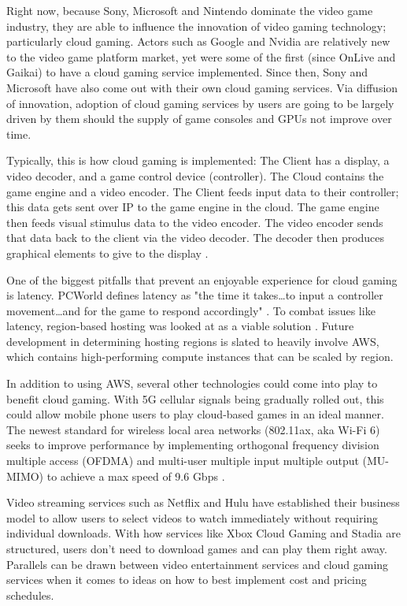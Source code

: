 \documentclass[titlepage, 12pt]{article}
\begin{document}
Right now, because Sony, Microsoft and Nintendo dominate the video game industry, they are able to influence the innovation of video gaming technology; particularly cloud gaming. Actors such as Google and Nvidia are relatively new to the video game platform market, yet were some of the first (since OnLive and Gaikai) to have a cloud gaming service implemented. Since then, Sony and Microsoft have also come out with their own cloud gaming services. Via diffusion of innovation, adoption of cloud gaming services by users are going to be largely driven by them should the supply of game consoles and GPUs not improve over time.

Typically, this is how cloud gaming is implemented: The Client has a display, a video decoder, and a game control device (controller). The Cloud contains the game engine and a video encoder. The Client feeds input data to their controller; this data gets sent over IP to the game engine in the cloud. The game engine then feeds visual stimulus data to the video encoder. The video encoder sends that data back to the client via the video decoder. The decoder then produces graphical elements to give to the display \citep{multimedia-systems}.

One of the biggest pitfalls that prevent an enjoyable experience for cloud gaming is latency. PCWorld defines latency as "the time it takes…to input a controller movement…and for the game to respond accordingly" \citep{pcworld}. To combat issues like latency, region-based hosting was looked at as a viable solution \citep{conf}. Future development in determining hosting regions is slated to heavily involve AWS, which contains high-performing compute instances that can be scaled by region.

In addition to using AWS, several other technologies could come into play to benefit cloud gaming. With 5G cellular signals being gradually rolled out, this could allow mobile phone users to play cloud-based games in an ideal manner. The newest standard for wireless local area networks (802.11ax, aka Wi-Fi 6) seeks to improve performance by implementing orthogonal frequency division multiple access (OFDMA) and multi-user multiple input multiple output (MU-MIMO) to achieve a max speed of 9.6 Gbps \citep{mobile-networks}.

Video streaming services such as Netflix and Hulu have established their business model to allow users to select videos to watch immediately without requiring individual downloads. With how services like Xbox Cloud Gaming and Stadia are structured, users don’t need to download games and can play them right away. Parallels can be drawn between video entertainment services and cloud gaming services when it comes to ideas on how to best implement cost and pricing schedules.
\end{document}
